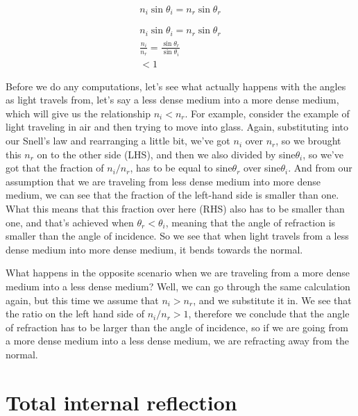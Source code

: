 \begin{equation}
n_i \sin \theta_i=n_r \sin \theta_r
\end{equation}

\begin{equation}
\begin{gathered}
n_i \sin \theta_i=n_r \sin \theta_r \\
\frac{n_i}{n_r}=\frac{\sin \theta_r}{\sin \theta_i} \\
<1
\end{gathered}
\end{equation}

Before we do any computations, let's see what actually happens with the angles as light travels from, let's say a less dense medium into a more dense medium, which will give us the relationship $n_i < n_r$. For example, consider the example of light traveling in air and then trying to move into glass. Again, substituting into our Snell's law and rearranging a little bit, we've got $n_i$ over $n_r$, so we brought this $n_r$ on to the other side (LHS), and then we also divided by sine$\theta_i$, so we've got that the fraction of $n_i / n_r$, has to be equal to sine$\theta_r$ over sine$\theta_i$. And from our assumption that we are traveling from less dense medium into more dense medium, we can see that the fraction of the left-hand side is smaller than one. What this means that this fraction over here (RHS) also has to be smaller than one, and that's achieved when $\theta_r < \theta_i$, meaning that the angle of refraction is smaller than the angle of incidence. So we see that when light travels from a less dense medium into more dense medium, it bends towards the normal. 

What happens in the opposite scenario when we are traveling from a more dense medium into a less dense medium? Well, we can go through the same calculation again, but this time we assume that $n_i > n_r$, and we substitute it in. We see that the ratio on the left hand side of $n_i/n_r > 1$, therefore we conclude that the angle of refraction has to be larger than the angle of incidence, so if we are going from a more dense medium into a less dense medium, we are refracting away from the normal.


\section{Total internal reflection}


